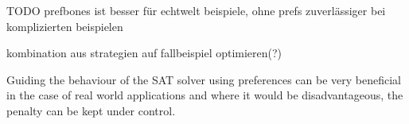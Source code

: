 TODO prefbones ist besser für echtwelt beispiele, ohne prefs zuverlässiger bei komplizierten beispielen

kombination aus strategien auf fallbeispiel optimieren(?)

Guiding the behaviour of the SAT solver using preferences can be very beneficial in the case of real world applications and where it would be disadvantageous, the penalty can be kept under control. 